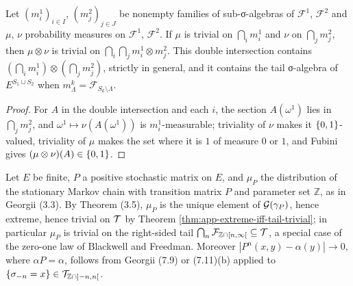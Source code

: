 \begin{lemma}
    \label{lem:app-prod-zero-one}
    \leanok

    Let $(m^1_i)_{i \in I}$, $(m^2_j)_{j \in J}$ be nonempty families of sub-σ-algebras of
    $\mathcal{F}^1$, $\mathcal{F}^2$ and $\mu$, $\nu$ probability measures on
    $\mathcal{F}^1$, $\mathcal{F}^2$.  If $\mu$ is trivial on $\bigcap_i m^1_i$ and $\nu$ on
    $\bigcap_j m^2_j$, then $\mu \otimes \nu$ is trivial on
    $\bigcap_i \bigcap_j m^1_i \otimes m^2_j$.  This double intersection contains
    $(\bigcap_i m^1_i) \otimes (\bigcap_j m^2_j)$, strictly in general, and it contains the
    tail σ-algebra of $E^{S_1 \sqcup S_2}$ when $m^k_\Lambda = \mathcal{F}_{S_k \setminus \Lambda}$.
\end{lemma}
\begin{proof}
    \leanok

    For $A$ in the double intersection and each $i$, the section $A(\omega^1)$ lies in
    $\bigcap_j m^2_j$, and $\omega^1 \mapsto \nu(A(\omega^1))$ is $m^1_i$-measurable; triviality
    of $\nu$ makes it $\left\{ 0,1 \right\}$-valued, triviality of $\mu$ makes the set where it is $1$ of
    measure $0$ or $1$, and Fubini gives $(\mu \otimes \nu)(A) \in \left\{ 0,1 \right\}$.
\end{proof}

\begin{example}
    \label{ex:app-markov}
    \leanok

    Let $E$ be finite, $P$ a positive stochastic matrix on $E$, and $\mu_P$ the distribution
    of the stationary Markov chain with transition matrix $P$ and parameter set $\mathbb{Z}$,
    as in Georgii (3.3).  By Theorem (3.5), $\mu_P$ is the unique element of
    $\mathcal{G}(\gamma_P)$, hence extreme, hence trivial on $\mathcal{T}$ by
    Theorem \ref{thm:app-extreme-iff-tail-trivial}; in particular $\mu_P$ is trivial on the
    right-sided tail $\bigcap_{n} \mathcal{F}_{\mathbb{Z} \cap [n, \infty[} \subseteq \mathcal{T}$,
    a special case of the zero-one law of Blackwell and Freedman.  Moreover
    $|P^n(x,y) - \alpha(y)| \to 0$, where $\alpha P = \alpha$, follows from Georgii (7.9) or
    (7.11)(b) applied to $\left\{ \sigma_{-n} = x \right\} \in \mathcal{T}_{\mathbb{Z} \cap ]-n,n[}$.
\end{example}

